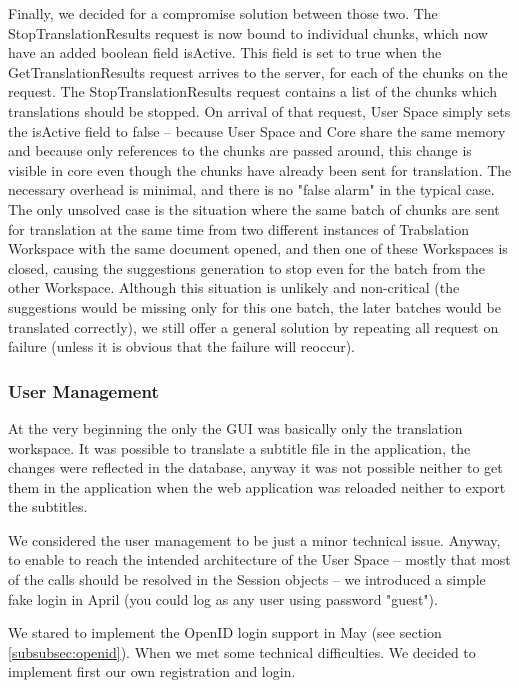 Finally, we decided for a compromise solution between those two. The StopTranslationResults request is now bound to individual chunks, which now have an added boolean field isActive. This field is set to true when the GetTranslationResults request arrives to the server, for each of the chunks on the request. The StopTranslationResults request contains a list of the chunks which translations should be stopped. On arrival of that request, User Space simply sets the isActive field to false -- because User Space and Core share the same memory and because only references to the chunks are passed around, this change is visible in core even though the chunks have already been sent for translation. The necessary overhead is minimal, and there is no "false alarm" in the typical case. The only unsolved case is the situation where the same batch of chunks are sent for translation at the same time from two different instances of Trabslation Workspace with the same document opened, and then one of these Workspaces is closed, causing the suggestions generation to stop even for the batch from the other Workspace. Although this situation is unlikely and non-critical (the suggestions would be missing only for this one batch, the later batches would be translated correctly), we still offer a general solution by repeating all request on failure (unless it is obvious that the failure will reoccur).

\subsubsection{User Management}

At the very beginning the only the GUI was basically only the translation workspace. It was possible to translate a subtitle file in the application, the changes were reflected in the database, anyway it was not possible neither to get them in the application when the web application was reloaded neither to export the subtitles.

We considered the user management to be just a minor technical issue. Anyway, to enable to reach the intended architecture of the User Space -- mostly that most of the calls should be resolved in the Session objects -- we introduced a simple fake login in April (you could log as any user using password "guest").

We stared to implement the OpenID login support in May (see section \ref{subsubsec:openid}). When we met some technical difficulties. We decided to implement first our own registration and login.

